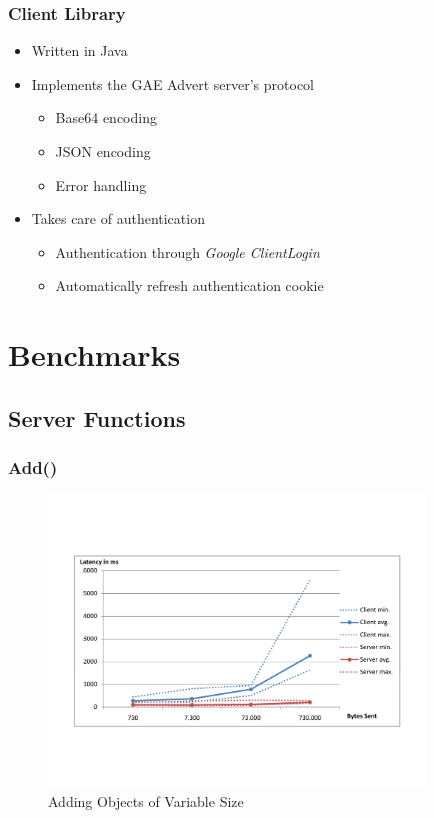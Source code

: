\documentclass{beamer}
\begin{document}
\frame
{
	\frametitle{Client Library}
	\begin{itemize}
		\item Written in Java
		\item Implements the GAE Advert server's protocol
		\begin{itemize}
			\item Base64 encoding
			\item JSON encoding
			\item Error handling 
		\end{itemize}
		\item Takes care of authentication
		\begin{itemize}
			\item Authentication through \emph{Google ClientLogin}
			\item Automatically refresh authentication cookie
		\end{itemize} 
	\end{itemize}
}

\section{Benchmarks}
\subsection{Server Functions}
\frame
{
	\frametitle{Add()}
	\begin{figure}[t]
	\begin{center}
	\includegraphics[trim = 0 5cm 0 5cm, width=10cm]{add_obj.pdf} 
	\caption{Adding Objects of Variable Size}
	\end{center}
	\end{figure}
}
\end{document}

